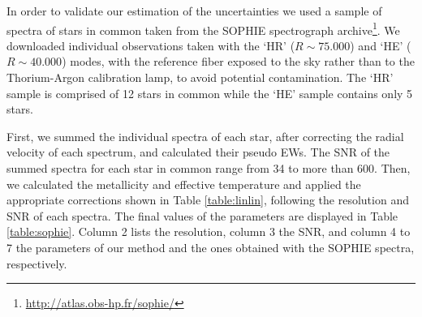 \documentclass{aa}
\begin{document}
In order to validate our estimation of the uncertainties we used a sample of spectra of stars in common taken from the SOPHIE spectrograph \citep{Bouchy-2006} archive\footnote{\url{http://atlas.obs-hp.fr/sophie/}}. We downloaded individual observations taken with the `HR' ($R\sim75.000$) and `HE' ($R\sim40.000$) modes, with the reference fiber exposed to the sky rather than to the Thorium-Argon calibration lamp, to avoid potential contamination. The `HR' sample is comprised of 12 stars in common while the `HE' sample contains only 5 stars.

First, we summed the individual spectra of each star, after correcting the radial velocity of each spectrum, and calculated their pseudo EWs. The SNR of the summed spectra for each star in common range from 34 to more than 600. Then, we calculated the metallicity and effective temperature and applied the appropriate corrections shown in Table \ref{table:linlin}, following the resolution and SNR of each spectra. The final values of the parameters are displayed in Table \ref{table:sophie}. Column 2 lists the resolution, column 3 the SNR, and column 4 to 7 the parameters of our method and the ones obtained with the SOPHIE spectra, respectively. %
\end{document}

